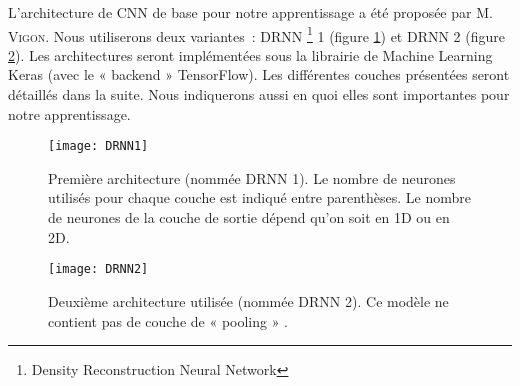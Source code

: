 L'architecture de CNN de base pour notre apprentissage a été proposée par M. \textsc{Vigon}. Nous utiliserons deux variantes : DRNN \footnote{Density Reconstruction Neural Network} 1 (figure \ref{fig:DRNN1}) et DRNN 2 (figure \ref{fig:DRNN2}). Les architectures seront implémentées sous la librairie de Machine Learning Keras (avec le « backend » TensorFlow). Les différentes couches présentées seront détaillés dans la suite. Nous indiquerons aussi en quoi elles sont importantes pour notre apprentissage.

\begin{figure}[!h]
\centering
\texttt{[image: DRNN1]}
\decoRule
\caption[DRNN1]{Première architecture (nommée DRNN 1). Le nombre de neurones utilisés pour chaque couche est indiqué entre parenthèses. Le nombre de neurones de la couche de sortie dépend qu'on soit en 1D ou en 2D.}
\label{fig:DRNN1}
\end{figure}

\begin{figure}[H] 
\centering
\texttt{[image: DRNN2]} 
\decoRule
\caption[DRNN2]{Deuxième architecture utilisée (nommée DRNN 2). Ce modèle ne contient pas de couche de « pooling » \footnotemark.}
\label{fig:DRNN2}
\end{figure}


